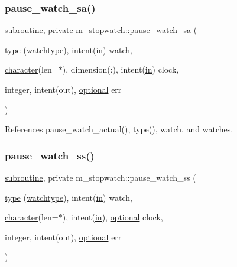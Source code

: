 \subsubsection{\texorpdfstring{pause\+\_\+watch\+\_\+sa()}{pause\_watch\_sa()}}
{\footnotesize\ttfamily \hyperlink{M__stopwatch_83_8txt_acfbcff50169d691ff02d4a123ed70482}{subroutine}, private m\+\_\+stopwatch\+::pause\+\_\+watch\+\_\+sa (\begin{DoxyParamCaption}\item[{\hyperlink{stop__watch_83_8txt_a70f0ead91c32e25323c03265aa302c1c}{type} (\hyperlink{structm__stopwatch_1_1watchtype}{watchtype}), intent(\hyperlink{M__journal_83_8txt_afce72651d1eed785a2132bee863b2f38}{in})}]{watch,  }\item[{\hyperlink{option__stopwatch_83_8txt_abd4b21fbbd175834027b5224bfe97e66}{character}(len=$\ast$), dimension(\+:), intent(\hyperlink{M__journal_83_8txt_afce72651d1eed785a2132bee863b2f38}{in})}]{clock,  }\item[{integer, intent(out), \hyperlink{option__stopwatch_83_8txt_aa4ece75e7acf58a4843f70fe18c3ade5}{optional}}]{err }\end{DoxyParamCaption})\hspace{0.3cm}{\ttfamily [private]}}



References pause\+\_\+watch\+\_\+actual(), type(), watch, and watches.

\mbox{\label{namespacem__stopwatch_afb410e70a5b4002d5028e0a284393959}} 
\subsubsection{\texorpdfstring{pause\+\_\+watch\+\_\+ss()}{pause\_watch\_ss()}}
{\footnotesize\ttfamily \hyperlink{M__stopwatch_83_8txt_acfbcff50169d691ff02d4a123ed70482}{subroutine}, private m\+\_\+stopwatch\+::pause\+\_\+watch\+\_\+ss (\begin{DoxyParamCaption}\item[{\hyperlink{stop__watch_83_8txt_a70f0ead91c32e25323c03265aa302c1c}{type} (\hyperlink{structm__stopwatch_1_1watchtype}{watchtype}), intent(\hyperlink{M__journal_83_8txt_afce72651d1eed785a2132bee863b2f38}{in})}]{watch,  }\item[{\hyperlink{option__stopwatch_83_8txt_abd4b21fbbd175834027b5224bfe97e66}{character}(len=$\ast$), intent(\hyperlink{M__journal_83_8txt_afce72651d1eed785a2132bee863b2f38}{in}), \hyperlink{option__stopwatch_83_8txt_aa4ece75e7acf58a4843f70fe18c3ade5}{optional}}]{clock,  }\item[{integer, intent(out), \hyperlink{option__stopwatch_83_8txt_aa4ece75e7acf58a4843f70fe18c3ade5}{optional}}]{err }\end{DoxyParamCaption})\hspace{0.3cm}{\ttfamily [private]}}



